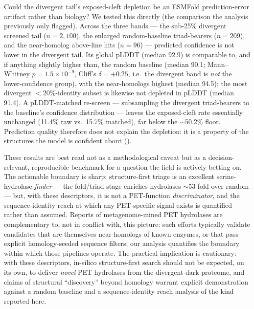 Could the divergent tail's exposed-cleft depletion be an ESMFold prediction-error
artifact rather than biology? We tested this directly (the comparison the analysis
previously only flagged). Across the three bands --- the sub-25\% divergent screened
tail ($n=2,100$), the enlarged random-baseline triad-bearers ($n=209$),
and the near-homolog above-line hits ($n=96$) --- predicted confidence is
not lower in the divergent tail. Its global pLDDT (median 92.9) is
comparable to, and if anything slightly higher than, the random baseline (median
90.1; Mann--Whitney $p=1.5\times10^{-9}$, Cliff's $\delta=+0.25$,
i.e.\ the divergent band is \emph{not} the lower-confidence group), with the
near-homologs highest (median 94.5); the most divergent $<$20\%-identity
subset is likewise not depleted in pLDDT (median 91.4). A
pLDDT-matched re-screen --- subsampling the divergent triad-bearers to the baseline's
confidence distribution --- leaves the exposed-cleft rate essentially unchanged
(11.4\% raw vs.\ 15.7\% matched), far below the
$\sim$50.2\% floor. Prediction quality therefore does not explain the
depletion: it is a property of the structures the model is confident about
().


These results are best read not as a methodological caveat but as a decision-relevant,
reproducible benchmark for a question the field is actively betting on. The actionable
boundary is sharp: structure-first triage is an excellent serine-hydrolase
\emph{finder} --- the fold/triad stage enriches hydrolases $\sim$53-fold
over random --- but, with these descriptors, it is not a PET-function
\emph{discriminator}, and the sequence-identity reach at which any PET-specific signal
exists is quantified rather than assumed. Reports of metagenome-mined PET hydrolases
are complementary to, not in conflict with, this picture: such efforts typically
validate candidates that are themselves near-homologs of known enzymes, or that pass
explicit homology-seeded sequence filters; our analysis quantifies the boundary
within which those pipelines operate. The practical implication is cautionary: with
these descriptors, in-silico structure-first search should not be expected, on its
own, to deliver \emph{novel} PET hydrolases from the divergent dark proteome, and
claims of structural ``discovery'' beyond homology warrant explicit demonstration
against a random baseline and a sequence-identity reach analysis of the kind reported
here.


